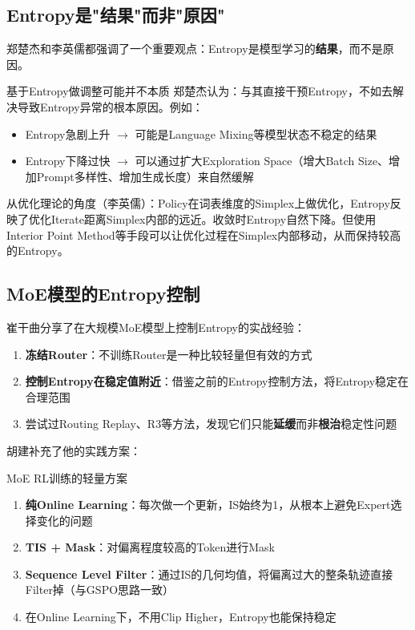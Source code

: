 \documentclass[a4paper]{article}
\begin{document}
\subsection{Entropy是"结果"而非"原因"}

郑楚杰和李英儒都强调了一个重要观点：Entropy是模型学习的\textbf{结果}，而不是原因。

\begin{knowledgebox}{基于Entropy做调整可能并不本质}
郑楚杰认为：与其直接干预Entropy，不如去解决导致Entropy异常的根本原因。例如：
\begin{itemize}
    \item Entropy急剧上升 $\rightarrow$ 可能是Language Mixing等模型状态不稳定的结果
    \item Entropy下降过快 $\rightarrow$ 可以通过扩大Exploration Space（增大Batch Size、增加Prompt多样性、增加生成长度）来自然缓解
\end{itemize}
从优化理论的角度（李英儒）：Policy在词表维度的Simplex上做优化，Entropy反映了优化Iterate距离Simplex内部的远近。收敛时Entropy自然下降。但使用Interior Point Method等手段可以让优化过程在Simplex内部移动，从而保持较高的Entropy。
\end{knowledgebox}

\subsection{MoE模型的Entropy控制}

崔干曲分享了在大规模MoE模型上控制Entropy的实战经验：

\begin{enumerate}
    \item \textbf{冻结Router}：不训练Router是一种比较轻量但有效的方式
    \item \textbf{控制Entropy在稳定值附近}：借鉴之前的Entropy控制方法，将Entropy稳定在合理范围
    \item 尝试过Routing Replay、R3等方法，发现它们只能\textbf{延缓}而非\textbf{根治}稳定性问题
\end{enumerate}

胡建补充了他的实践方案：

\begin{importantbox}{MoE RL训练的轻量方案}
\begin{enumerate}
    \item \textbf{纯Online Learning}：每次做一个更新，IS始终为1，从根本上避免Expert选择变化的问题
    \item \textbf{TIS + Mask}：对偏离程度较高的Token进行Mask
    \item \textbf{Sequence Level Filter}：通过IS的几何均值，将偏离过大的整条轨迹直接Filter掉（与GSPO思路一致）
    \item 在Online Learning下，不用Clip Higher，Entropy也能保持稳定
\end{enumerate}
\end{importantbox}
\end{document}
